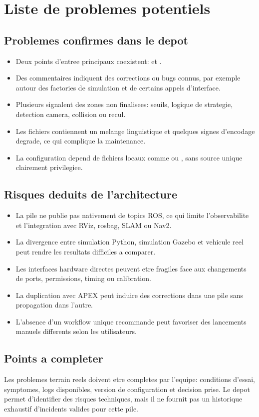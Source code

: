 \section{Liste de problemes potentiels}

\subsection{Problemes confirmes dans le depot}

\begin{itemize}
  \item Deux points d'entree principaux coexistent:  et .
  \item Des commentaires indiquent des corrections ou bugs connus, par exemple autour des factories de simulation et de certains appels d'interface.
  \item Plusieurs  signalent des zones non finalisees: seuils, logique de strategie, detection camera, collision ou recul.
  \item Les fichiers contiennent un melange linguistique et quelques signes d'encodage degrade, ce qui complique la maintenance.
  \item La configuration depend de fichiers locaux comme  ou , sans source unique clairement privilegiee.
\end{itemize}

\subsection{Risques deduits de l'architecture}

\begin{itemize}
  \item La pile ne publie pas nativement de topics ROS, ce qui limite l'observabilite et l'integration avec RViz, rosbag, SLAM ou Nav2.
  \item La divergence entre simulation Python, simulation Gazebo et vehicule reel peut rendre les resultats difficiles a comparer.
  \item Les interfaces hardware directes peuvent etre fragiles face aux changements de ports, permissions, timing ou calibration.
  \item La duplication avec APEX peut induire des corrections dans une pile sans propagation dans l'autre.
  \item L'absence d'un workflow unique recommande peut favoriser des lancements manuels differents selon les utilisateurs.
\end{itemize}

\subsection{Points a completer}

Les problemes terrain reels doivent etre completes par l'equipe: conditions d'essai, symptomes, logs disponibles, version de configuration et decision prise. Le depot permet d'identifier des risques techniques, mais il ne fournit pas un historique exhaustif d'incidents valides pour cette pile.

